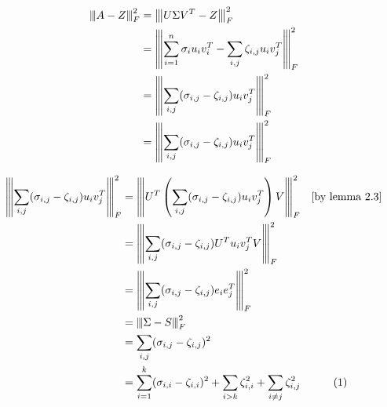\documentclass[a4paper]{article}
\newcommand{\norm}[1]{{\left\vert\kern-0.25ex\left\vert\kern-0.25ex\left\vert #1 
    \right\vert\kern-0.25ex\right\vert\kern-0.25ex\right\vert}}
\begin{document}

\begin{align*}
\norm{A-Z}_F^2 &= \norm{U\Sigma V^T - Z}_F^2\\
&= \norm{\sum_{i=1}^n \sigma_i u_i v_i^T
- \sum_{i,j} \zeta_{i,j} u_i v_j^T}_F^2\\
&= \norm{\sum_{i,j}(\sigma_{i,j} - \zeta_{i,j})u_i v_j^T}_F^2\\
&= \norm{\sum_{i,j}(\sigma_{i,j} - \zeta_{i,j})u_i v_j^T}_F^2\\
\end{align*}

\begin{align*}
\norm{\sum_{i,j}(\sigma_{i,j} - \zeta_{i,j})u_i v_j^T}_F^2
&= \norm{U^T\left( \sum_{i,j}(\sigma_{i,j} - \zeta_{i,j})u_i v_j^T \right) V}_F^2 \quad \text{[by lemma 2.3]}\\
&= \norm{\sum_{i,j}(\sigma_{i,j} - \zeta_{i,j})U^T u_i v_j^T  V}_F^2\\
&= \norm{\sum_{i,j}(\sigma_{i,j} - \zeta_{i,j})e_i e_j^T}_F^2\\
&= \norm{\Sigma - S}_F^2\\
&= \sum_{i,j}(\sigma_{i,j} - \zeta_{i,j})^2\\
&= \sum_{i=1}^k(\sigma_{i,i} - \zeta_{i,i})^2 + \sum_{i>k}\zeta_{i,i}^2 + \sum_{i \neq j} \zeta_{i,j}^2 \quad
\stepcounter{equation}\tag{\theequation}\label{myeq1}\\
\end{align*}

\end{document}
